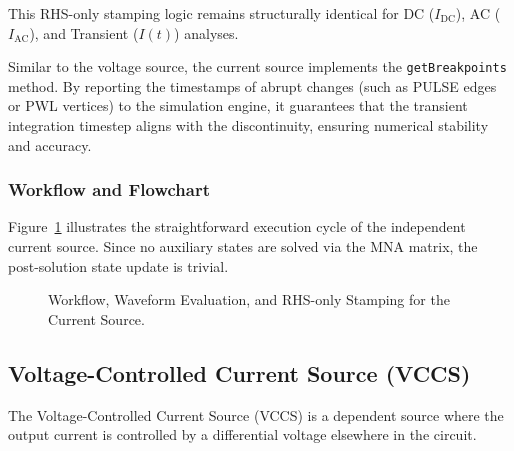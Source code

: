 This RHS-only stamping logic remains structurally identical for DC ($I_{\text{DC}}$), AC ($I_{\text{AC}}$), and Transient ($I(t)$) analyses.

Similar to the voltage source, the current source implements the \texttt{getBreakpoints} method. By reporting the timestamps of abrupt changes (such as PULSE edges or PWL vertices) to the simulation engine, it guarantees that the transient integration timestep aligns with the discontinuity, ensuring numerical stability and accuracy.

\subsubsection{Workflow and Flowchart}
Figure~\ref{fig:cs_flowchart} illustrates the straightforward execution cycle of the independent current source. Since no auxiliary states are solved via the MNA matrix, the post-solution state update is trivial.

\begin{figure}[H]
    \centering
    \caption{Workflow, Waveform Evaluation, and RHS-only Stamping for the Current Source.}
    \label{fig:cs_flowchart}
\end{figure}

\subsection{Voltage-Controlled Current Source (VCCS)}
The Voltage-Controlled Current Source (VCCS) is a dependent source where the output current is controlled by a differential voltage elsewhere in the circuit.

